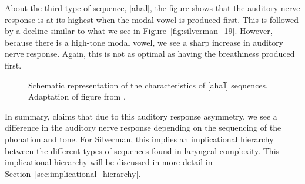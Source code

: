 About the third type of sequence, [aha˥], the figure shows that the auditory nerve response is at its highest when the modal vowel is produced first. This is followed by a decline similar to what we see in Figure~\ref{fig:silverman_19}. However, because there is a high-tone modal vowel, we see a sharp increase in auditory nerve response. Again, this is not as optimal as having the breathiness produced first. 
\begin{figure}[h!]
    \centering
    \caption{Schematic representation of the characteristics of [aha˥] sequences. Adaptation of figure from \citet{silvermanLaryngealComplexityOtomanguean1997}.}
    \label{fig:silverman_20}
\end{figure}

In summary, \citeauthor{silvermanLaryngealComplexityOtomanguean1997} claims that due to this auditory response asymmetry, we see a difference in the auditory nerve response depending on the sequencing of the phonation and tone. For Silverman, this implies an implicational hierarchy between the different types of sequences found in laryngeal complexity. This implicational hierarchy will be discussed in more detail in Section~\ref{sec:implicational_hierarchy}.

